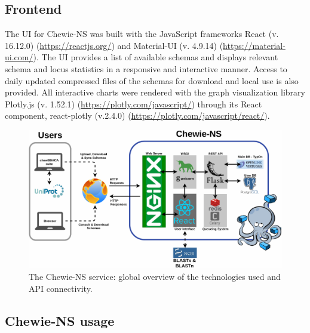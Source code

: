 \subsection{Frontend} \label{ssec:ch3_database_creation_frontend}

The \ac{UI} for \ac{Chewie-NS} was built with the JavaScript frameworks React (v. 16.12.0) (\url{https://reactjs.org/}) and Material-UI (v. 4.9.14) (\url{https://material-ui.com/}). The \ac{UI} provides a list of available schemas and displays relevant schema and locus statistics in a responsive and interactive manner. Access to daily updated compressed files of the schemas for download and local use is also provided. All interactive charts were rendered with the graph visualization library Plotly.js (v. 1.52.1) (\url{https://plotly.com/javascript/}) through its React component, react-plotly (v.2.4.0) (\url{https://plotly.com/javascript/react/}).

\newpage
\begin{landscape}
\vspace*{\fill}
\begin{figure}[h!]
    \centering
    \includegraphics[width=20cm]{figures/chapter 3/Figure1.pdf}
    \caption[The Chewie-NS service: global overview of the technologies used and API connectivity.]{The Chewie-NS service: global overview of the technologies used and API connectivity.}
    \label{fig:chap3_figure1}
\end{figure}
\vspace*{\fill}
\end{landscape}

\subsection{Chewie-NS usage} \label{ssec:ch3_database_creation_usage}

